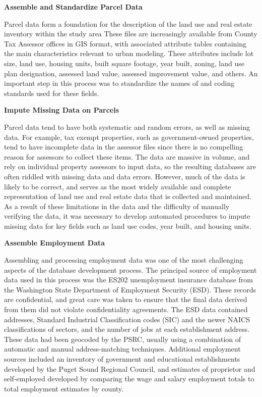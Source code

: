 \begin{description}

\item{\textbf{Assemble and Standardize Parcel Data}}

Parcel data form a foundation for the description of the land use
and real estate inventory within the study area  These files are
increasingly available from County Tax Assessor offices in GIS
format, with associated attribute tables containing the main
characteristics relevant to urban modeling.  These attributes
include lot size, land use, housing units, built square footage,
year built, zoning, land use plan designation, assessed land
value, assessed improvement value, and others.  An important step
in this process was to standardize the names of and coding
standards used for these fields.

\item{\textbf{Impute Missing Data on Parcels}}

Parcel data tend to have both systematic and random errors, as
well as missing data.  For example, tax exempt properties, such as
government-owned properties, tend to have incomplete data in the
assessor files since there is no compelling reason for assessors
to collect these items.  The data are massive in volume, and rely
on individual property assessors to input data, so the resulting
databases are often riddled with missing data and data errors.
However, much of the data is likely to be correct, and serves as
the most widely available and complete representation of land use
and real estate data that is collected and maintained. As a result
of these limitations in the data and the difficulty of manually
verifying the data, it was necessary to develop automated
procedures to impute missing data for key fields such as land use
codes, year built, and housing units.

\item{\textbf{Assemble Employment Data}}

Assembling and processing employment data was one of the most
challenging aspects of the database development process. The
principal source of employment data used in this process was the
ES202 unemployment insurance database from the Washington State
Department of Employment Security (ESD). These records are
confidential, and great care was taken to ensure that the final
data derived from them did not violate confidentiality agreements.
The ESD data contained addresses, Standard Industrial
Classification codes (SIC) and the newer NAICS classifications of
sectors, and the number of jobs at each establishment address.
These data had been geocoded by the PSRC, usually using a
combination of automatic and manual address-matching techniques.
Additional employment sources included an inventory of government
and educational establishments developed by the Puget Sound
Regional Council, and estimates of proprietor and self-employed
developed by comparing the wage and salary employment totals to
total employment estimates by county.


\end{description}
